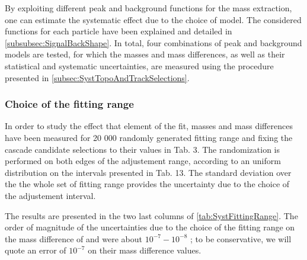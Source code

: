 By exploiting different peak and background functions for the mass extraction, one can estimate the systematic effect due to the choice of model. The considered functions for each particle have been explained and detailed in \Sec\ref{subsubsec:SignalBackShape}. In total, four combinations of peak and background models are tested, for which the masses and mass differences, as well as their statistical and systematic uncertainties, are measured using the procedure presented in \Sec\ref{subsec:SystTopoAndTrackSelections}. 

\subsubsection{Choice of the fitting range}
\label{subsubsec:SystFittingRange}

In order to study the effect that element of the fit, masses and mass differences have been measured for 20 000 randomly generated fitting range and fixing the cascade candidate selections to their values in Tab. 3. The randomization is performed on both edges of the adjustement range, according to an uniform distribution on the intervals presented in Tab. 13. The standard deviation over the the whole set of fitting range provides the uncertainty due to the choice of the adjustement interval.

The results are presented in the two last columns of \tab\ref{tab:SystFittingRange}. The order of magnitude of the uncertainties due to the choice of the fitting range on the mass difference of \rmXi and \rmOmega were about $10^{-7}-10^{-8}$ ; to be conservative, we will quote an error of $10^{-7}$ on their mass difference values.

